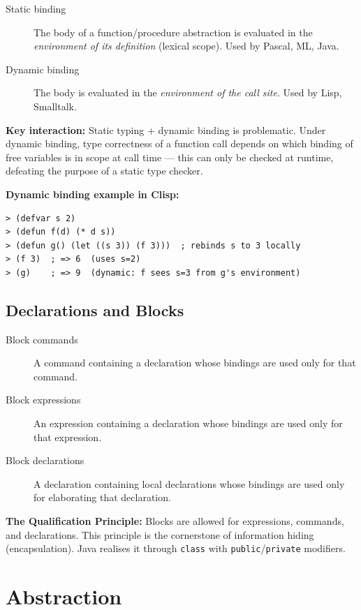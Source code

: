 \documentclass[12pt,a4paper]{article}
\begin{document}
\begin{description}
  \item[Static binding] The body of a function/procedure abstraction is evaluated in
        the \emph{environment of its definition} (lexical scope).
        Used by Pascal, ML, Java.
  \item[Dynamic binding] The body is evaluated in the \emph{environment of the call site}.
        Used by Lisp, Smalltalk.
\end{description}

\textbf{Key interaction:} Static typing + dynamic binding is problematic.
Under dynamic binding, type correctness of a function call depends on which
binding of free variables is in scope at call time — this can only be checked at runtime,
defeating the purpose of a static type checker.

\textbf{Dynamic binding example in Clisp:}
\begin{lstlisting}[style=caml,numbers=none]
> (defvar s 2)
> (defun f(d) (* d s))
> (defun g() (let ((s 3)) (f 3)))  ; rebinds s to 3 locally
> (f 3)  ; => 6  (uses s=2)
> (g)    ; => 9  (dynamic: f sees s=3 from g's environment)
\end{lstlisting}

\subsection{Declarations and Blocks}

\begin{description}
  \item[Block commands] A command containing a declaration whose bindings are used
        only for that command.
  \item[Block expressions] An expression containing a declaration whose bindings
        are used only for that expression.
  \item[Block declarations] A declaration containing local declarations whose bindings
        are used only for elaborating that declaration.
\end{description}

\textbf{The Qualification Principle:} Blocks are allowed for expressions, commands,
and declarations. This principle is the cornerstone of information hiding (encapsulation).
Java realises it through \texttt{class} with \texttt{public}/\texttt{private} modifiers.

\section{Abstraction}
\end{document}
